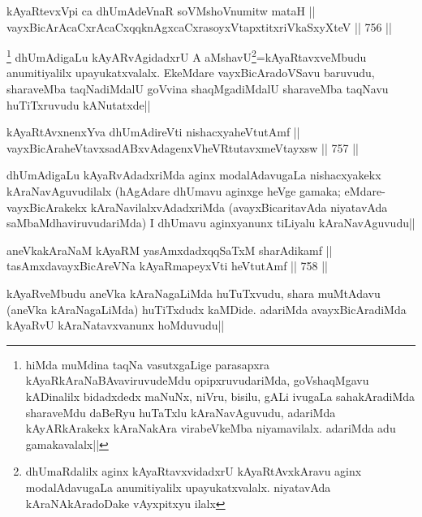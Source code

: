 
\begin{shl}
kAyaRtevxV\s pi ca dhUmAdeVnaR soVM\s shoV\s numitw mataH || \\
vayxBicArAcaCxrAcaCxqqknAgxcaCxrasoyxVtapxtitxriVkaSxyXteV ||  756 ||  
\end{shl}

\begin{artha}
\footnote{hiMda muMdina taqNa vasutxgaLige parasapxra kAyaRkAraNaBAvaviruvudeMdu opipxruvudariMda, goVshaqMgavu kADinalilx bidadxdedx maNuNx, niVru, bisilu, gALi ivugaLa sahakAradiMda sharaveMdu daBeRyu huTaTxlu kAraNavAguvudu, adariMda kAyARkArakekx kAraNakAra virabeVkeMba niyamavilalx. adariMda adu gamakavalalx||}
dhUmAdigaLu kAyARvAgidadxrU A aMshavU\footnote{dhUmaRdalilx aginx kAyaRtavxvidadxrU kAyaRtAvxkAravu aginx modalAdavugaLa anumitiyalilx upayukatxvalalx. niyatavAda kAraNAkAradoDake vAyxpitxyu ilalx}=kAyaRtavxveMbudu anumitiyalilx upayukatxvalalx. EkeMdare vayxBicAradoVSavu baruvudu, sharaveMba taqNadiMdalU goVvina shaqMgadiMdalU sharaveMba taqNavu huTiTxruvudu kANutatxde||
\end{artha}


\begin{shl}
kAyaRtAvxnenxYva dhUmAdireVti nishacxyaheVtutAmf || \\
vayxBicAraheVtavxsadABxvAdagenxVheVRtutavxmeVtayxsw ||  757 ||  
\end{shl}

\begin{artha}
dhUmAdigaLu kAyaRvAdadxriMda aginx modalAdavugaLa nishacxyakekx kAraNavAguvudilalx (hAgAdare dhUmavu aginxge heVge gamaka; eMdare- vayxBicArakekx kAraNavilalxvAdadxriMda (avayxBicaritavAda niyatavAda saMbaMdhaviruvudariMda) I dhUmavu aginxyanunx tiLiyalu kAraNavAguvudu||
\end{artha}


\begin{shl}
aneVkakAraNaM kAyaRM yasAmxdadxqqSaTxM sharAdikamf || \\
tasAmxdavayxBicAreVNa kAyaRmapeyxVti heVtutAmf ||  758 ||  
\end{shl}

\begin{artha}
kAyaRveMbudu aneVka kAraNagaLiMda huTuTxvudu, shara muMtAdavu (aneVka kAraNagaLiMda) huTiTxdudx kaMDide. adariMda avayxBicAradiMda kAyaRvU kAraNatavxvanunx hoMduvudu||
\end{artha}

